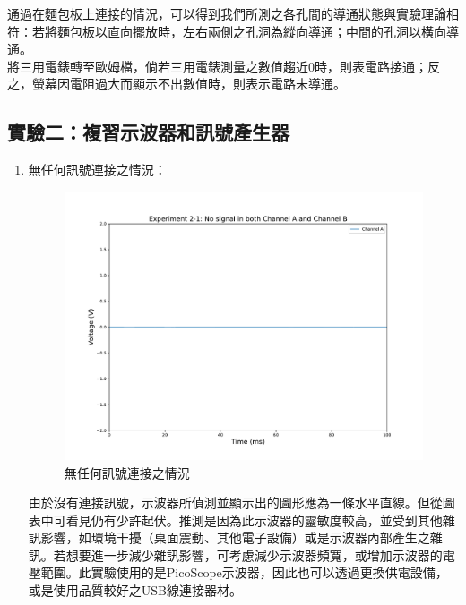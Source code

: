 \documentclass[12pt,a4paper]{article}
\begin{document}
\begin{CJK}{UTF8}{bkai}
通過在麵包板上連接的情況，可以得到我們所測之各孔間的導通狀態與實驗理論相符：若將麵包板以直向擺放時，左右兩側之孔洞為縱向導通；中間的孔洞以橫向導通。\\
將三用電錶轉至歐姆檔，倘若三用電錶測量之數值趨近0時，則表電路接通；反之，螢幕因電阻過大而顯示不出數值時，則表示電路未導通。

\clearpage
\subsection{實驗二：複習示波器和訊號產生器}
\hfill
\begin{enumerate}
    \item 無任何訊號連接之情況：
    \begin{figure}[h]
        \centering
        \includegraphics[width=0.85\linewidth]{figures/exp2/exp2-1.pdf}
        \caption{無任何訊號連接之情況}
        \label{fig:exp2_1}
    \end{figure}
    
    由於沒有連接訊號，示波器所偵測並顯示出的圖形應為一條水平直線。但從圖表中可看見仍有少許起伏。推測是因為此示波器的靈敏度較高，並受到其他雜訊影響，如環境干擾（桌面震動、其他電子設備）或是示波器內部產生之雜訊。若想要進一步減少雜訊影響，可考慮減少示波器頻寬，或增加示波器的電壓範圍。此實驗使用的是PicoScope示波器，因此也可以透過更換供電設備，或是使用品質較好之USB線連接器材。
    

\end{enumerate}
\end{CJK}
\end{document}
